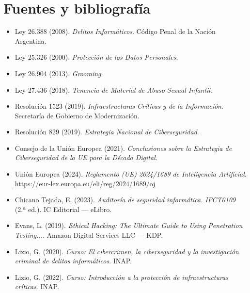 \documentclass[11pt,a4paper]{article}
\begin{document}
\section{Fuentes y bibliografía}

\begin{itemize}[leftmargin=*]
  \item Ley 26.388 (2008). \textit{Delitos Informáticos}. Código Penal de la Nación Argentina.
  \item Ley 25.326 (2000). \textit{Protección de los Datos Personales}.
  \item Ley 26.904 (2013). \textit{Grooming}.
  \item Ley 27.436 (2018). \textit{Tenencia de Material de Abuso Sexual Infantil}.
  \item Resolución 1523 (2019). \textit{Infraestructuras Críticas y de la Información}. Secretaría de Gobierno de Modernización.
  \item Resolución 829 (2019). \textit{Estrategia Nacional de Ciberseguridad}.
  \item Consejo de la Unión Europea (2021). \textit{Conclusiones sobre la Estrategia de Ciberseguridad de la UE para la Década Digital}.
  \item Unión Europea (2024). \textit{Reglamento (UE) 2024/1689 de Inteligencia Artificial}. \url{https://eur-lex.europa.eu/eli/reg/2024/1689/oj}
  \item Chicano Tejada, E. (2023). \textit{Auditoría de seguridad informática. IFCT0109} (2.ª ed.). IC Editorial --- eLibro.
  \item Evans, L. (2019). \textit{Ethical Hacking: The Ultimate Guide to Using Penetration Testing...}. Amazon Digital Services LLC --- KDP.
  \item Lizio, G. (2020). \textit{Curso: El cibercrimen, la ciberseguridad y la investigación criminal de delitos informáticos}. INAP.
  \item Lizio, G. (2022). \textit{Curso: Introducción a la protección de infraestructuras críticas}. INAP.
\end{itemize}
\end{document}
